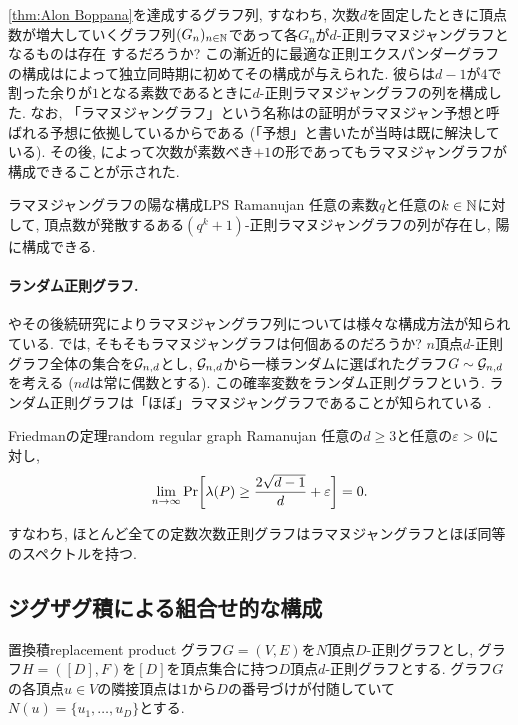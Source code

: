 \cref{thm:Alon Boppana}を達成するグラフ列, すなわち,
次数$d$を固定したときに頂点数が増大していくグラフ列$(G_n)_{n\in\mathbb{N}}$であって各$G_n$が$d$-正則ラマヌジャングラフとなるものは存在
するだろうか?
この漸近的に最適な正則エクスパンダーグラフの構成は\citet{LPS88,Mar88}によって独立同時期に初めてその構成が与えられた.
彼らは$d-1$が$4$で割った余りが$1$となる素数であるときに$d$-正則ラマヌジャングラフの列を構成した.
なお, 「ラマヌジャングラフ」という名称は\cite{LPS88}の証明がラマヌジャン予想と呼ばれる予想に依拠しているからである
(「予想」と書いたが当時は既に解決している).
その後, \citet{Mor94}によって次数が素数べき$+1$の形であってもラマヌジャングラフが構成できることが示された.
\begin{theorem}{ラマヌジャングラフの陽な構成}{LPS Ramanujan}
    任意の素数$q$と任意の$k\in\mathbb{N}$に対して, 頂点数が発散するある$(q^k+1)$-正則ラマヌジャングラフの列が存在し, 陽に構成できる.
\end{theorem}

\paragraph*{ランダム正則グラフ.}
\citet{LPS88}やその後続研究によりラマヌジャングラフ列については様々な構成方法が知られている.
では, そもそもラマヌジャングラフは何個あるのだろうか?
$n$頂点$d$-正則グラフ全体の集合を$\mathcal{G}_{n,d}$とし,
$\mathcal{G}_{n,d}$から一様ランダムに選ばれたグラフ$G\sim\mathcal{G}_{n,d}$を考える
($nd$は常に偶数とする).
この確率変数をランダム正則グラフという.
ランダム正則グラフは「ほぼ」ラマヌジャングラフであることが知られている
\cite{Friedman_random_regular}.
\begin{theorem}{Friedmanの定理}{random regular graph Ramanujan}
    任意の$d\ge 3$と任意の$\varepsilon > 0$に対し,
    \[ \lim_{n\to\infty}\Pr\sbra*{\lambda(P) \ge \frac{2\sqrt{d-1}}{d} + \varepsilon} = 0. \]
\end{theorem}
すなわち, ほとんど全ての定数次数正則グラフはラマヌジャングラフとほぼ同等のスペクトルを持つ.

\subsection{ジグザグ積による組合せ的な構成}
\begin{definition}{置換積}{replacement product}
    グラフ$G=(V,E)$を$N$頂点$D$-正則グラフとし, グラフ$H=([D],F)$を$[D]$を頂点集合に持つ$D$頂点$d$-正則グラフとする.
    グラフ$G$の各頂点$u\in V$の隣接頂点は$1$から$D$の番号づけが付随していて$N(u)=\{u_1,\dots,u_D\}$とする.

\end{definition}

